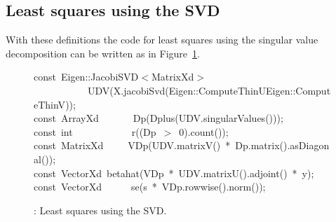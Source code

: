 \documentclass[shortnames,article]{jss}
\newcommand{\hlstd}[1]{\textcolor[rgb]{0,0,0}{#1}}
\newcommand{\hlnum}[1]{\textcolor[rgb]{0,0,0}{#1}}
\newcommand{\hlopt}[1]{\textcolor[rgb]{0,0,0}{#1}}
\newcommand{\hlkwb}[1]{\textcolor[rgb]{0.13,0.54,0.13}{#1}}
\newcommand{\hlkwd}[1]{\textcolor[rgb]{0,0,0}{#1}}
\begin{document}
\subsection{Least squares using the SVD}
\label{sec:SVDls}

With these definitions the code for least squares using the singular
value decomposition can be written as in Figure~\ref{SVDLS}.
\begin{figure}[htb]
    \noindent
    \ttfamily
    \hlkwb{const\ }\hlstd{Eigen}\hlopt{::}\hlstd{JacobiSVD}\hlopt{$<$}\hlstd{MatrixXd}\hlopt{$>$}\hspace*{\fill}\\
    \hlstd{}\hlstd{\ \ \ \ \ \ \ \ \ \ \ }\hlstd{}\hlkwd{UDV}\hlstd{}\hlopt{(}\hlstd{X}\hlopt{.}\hlstd{}\hlkwd{jacobiSvd}\hlstd{}\hlopt{(}\hlstd{Eigen}\hlopt{::}\hlstd{ComputeThinU}\hlopt{\textbar }\hlstd{Eigen}\hlopt{::}\hlstd{ComputeThinV}\hlopt{));}\hspace*{\fill}\\
    \hlstd{}\hlkwb{const\ }\hlstd{ArrayXd}\hlstd{\ \ \ \ \ \ \ }\hlstd{}\hlkwd{Dp}\hlstd{}\hlopt{(}\hlstd{}\hlkwd{Dplus}\hlstd{}\hlopt{(}\hlstd{UDV}\hlopt{.}\hlstd{}\hlkwd{singularValues}\hlstd{}\hlopt{()));}\hspace*{\fill}\\
    \hlstd{}\hlkwb{const\ int}\hlstd{\ \ \ \ \ \ \ \ \ \ \ \ }\hlkwb{}\hlstd{}\hlkwd{r}\hlstd{}\hlopt{((}\hlstd{Dp\ }\hlopt{$>$\ }\hlstd{}\hlnum{0}\hlstd{}\hlopt{).}\hlstd{}\hlkwd{count}\hlstd{}\hlopt{());}\hspace*{\fill}\\
    \hlstd{}\hlkwb{const\ }\hlstd{MatrixXd}\hlstd{\ \ \ \ \ }\hlstd{}\hlkwd{VDp}\hlstd{}\hlopt{(}\hlstd{UDV}\hlopt{.}\hlstd{}\hlkwd{matrixV}\hlstd{}\hlopt{()\ {*}\ }\hlstd{Dp}\hlopt{.}\hlstd{}\hlkwd{matrix}\hlstd{}\hlopt{().}\hlstd{}\hlkwd{asDiagonal}\hlstd{}\hlopt{());}\hspace*{\fill}\\
    \hlstd{}\hlkwb{const\ }\hlstd{VectorXd\ }\hlkwd{betahat}\hlstd{}\hlopt{(}\hlstd{VDp\ }\hlopt{{*}\ }\hlstd{UDV}\hlopt{.}\hlstd{}\hlkwd{matrixU}\hlstd{}\hlopt{().}\hlstd{}\hlkwd{adjoint}\hlstd{}\hlopt{()\ {*}\ }\hlstd{y}\hlopt{);}\hspace*{\fill}\\
    \hlstd{}\hlkwb{const\ }\hlstd{VectorXd}\hlstd{\ \ \ \ \ \ }\hlstd{}\hlkwd{se}\hlstd{}\hlopt{(}\hlstd{s\ }\hlopt{{*}\ }\hlstd{VDp}\hlopt{.}\hlstd{}\hlkwd{rowwise}\hlstd{}\hlopt{().}\hlstd{}\hlkwd{norm}\hlstd{}\hlopt{());}\hlstd{}\hspace*{\fill}\\
    \mbox{}
    \normalfont
    \normalsize
  \caption{: Least squares using the SVD.}
  \label{SVDLS}
\end{figure}
\end{document}
